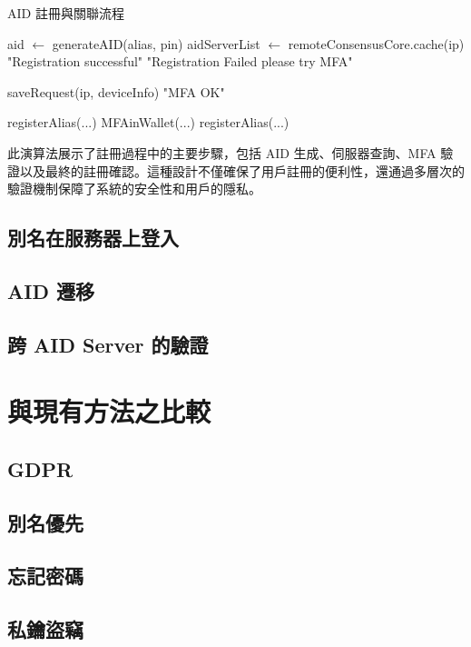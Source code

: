 \begin{algorithm}
  \caption{AID 註冊與關聯流程}
  \begin{algorithmic}[1]
    \State aid $\gets$ generateAID(alias, pin)
    \State aidServerList $\gets$ remoteConsensusCore.cache(ip)
    \State \Return "Registration successful"
    \EndIf
    \EndFor
    \State \Return "Registration Failed please try MFA"
    \EndFunction

    \State saveRequest(ip, deviceInfo)
    \State \Return "MFA OK"
    \EndFunction

    \State registerAlias(...) 
    \State MFAinWallet(...) 
    \State registerAlias(...) 
    \EndFunction
  \end{algorithmic}
\end{algorithm}

此演算法展示了註冊過程中的主要步驟，包括 AID 生成、伺服器查詢、MFA 驗證以及最終的註冊確認。這種設計不僅確保了用戶註冊的便利性，還通過多層次的驗證機制保障了系統的安全性和用戶的隱私。

\subsection{別名在服務器上登入}
\subsection{AID 遷移}
\subsection{跨 AID Server 的驗證}

\section{與現有方法之比較}
\subsection{GDPR}
\subsection{別名優先}
\subsection{忘記密碼}
\subsection{私鑰盜竊}